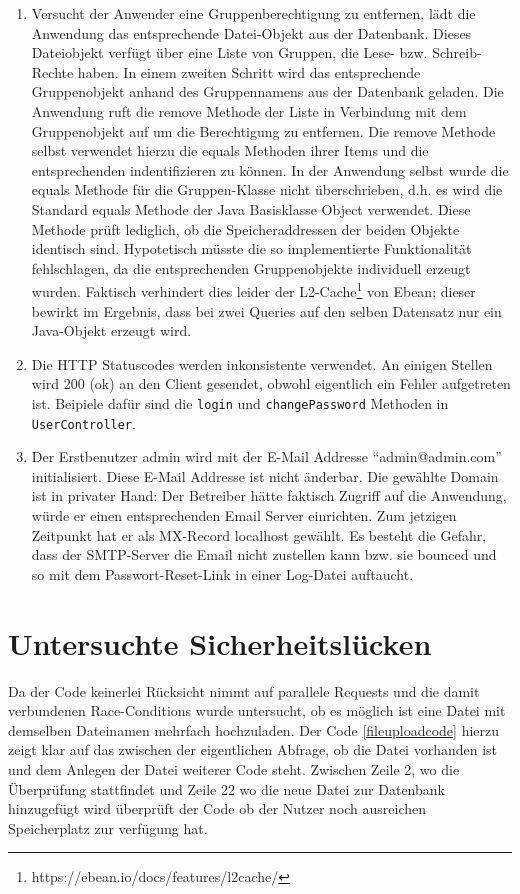 \documentclass[12pt,DIV14,BCOR10mm,a4paper,parskip=half-,headsepline,headinclude,english,ngerman,bibliography=totocnumbered]{scrreprt}
\begin{document}
\begin{enumerate}
  \item Versucht der Anwender eine Gruppenberechtigung zu entfernen, lädt die Anwendung das entsprechende Datei-Objekt aus der Datenbank. Dieses Dateiobjekt verfügt über eine Liste von Gruppen, die Lese- bzw. Schreib-Rechte haben. In einem zweiten Schritt wird das entsprechende Gruppenobjekt anhand des Gruppennamens aus der Datenbank geladen. Die Anwendung ruft die remove Methode der Liste in Verbindung mit dem Gruppenobjekt auf um die Berechtigung zu entfernen. Die remove Methode selbst verwendet hierzu die equals Methoden ihrer Items und die entsprechenden indentifizieren zu können. In der Anwendung selbst wurde die equals Methode für die Gruppen-Klasse nicht überschrieben, d.h. es wird die Standard equals Methode der Java Basisklasse Object verwendet. Diese Methode prüft lediglich, ob die Speicheraddressen der beiden Objekte identisch sind. Hypotetisch müsste die so implementierte Funktionalität fehlschlagen, da die entsprechenden Gruppenobjekte individuell erzeugt wurden. Faktisch verhindert dies leider der L2-Cache\footnote{https://ebean.io/docs/features/l2cache/} von Ebean; dieser bewirkt im Ergebnis, dass bei zwei Queries auf den selben Datensatz nur ein Java-Objekt erzeugt wird.
  	\item Die HTTP Statuscodes werden inkonsistente verwendet. An einigen Stellen wird 200 (ok) an den Client gesendet, obwohl eigentlich ein Fehler aufgetreten ist. Beipiele dafür sind die \texttt{login} und \texttt{changePassword} Methoden in \texttt{UserController}.
  	\item Der Erstbenutzer admin wird mit der E-Mail Addresse \enquote{admin@admin.com} initialisiert. Diese E-Mail Addresse ist nicht änderbar. Die gewählte Domain ist in privater Hand: Der Betreiber hätte faktisch Zugriff auf die Anwendung, würde er einen entsprechenden Email Server einrichten. Zum jetzigen Zeitpunkt hat er als MX-Record localhost gewählt. Es besteht die Gefahr, dass der SMTP-Server die Email nicht zustellen kann bzw. sie bounced und so mit dem Passwort-Reset-Link in einer Log-Datei auftaucht.

\end{enumerate}

\chapter{Untersuchte Sicherheitslücken}
Da der Code keinerlei Rücksicht nimmt auf parallele Requests und die damit verbundenen Race-Conditions wurde untersucht, ob es möglich ist eine Datei mit demselben Dateinamen mehrfach hochzuladen. Der Code \ref{fileuploadcode} hierzu zeigt klar auf das zwischen der eigentlichen Abfrage, ob die Datei vorhanden ist und dem Anlegen der Datei weiterer Code steht. Zwischen Zeile 2, wo die Überprüfung stattfindet und Zeile 22 wo die neue Datei zur Datenbank hinzugefügt wird überprüft der Code ob der Nutzer noch ausreichen Speicherplatz zur verfügung hat.
\end{document}

